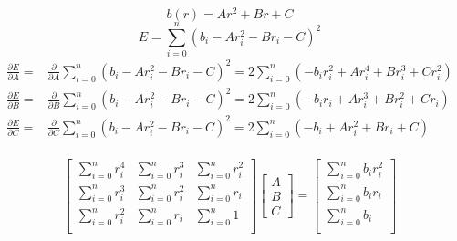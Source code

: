 \begin{equation}
    b(r)=Ar^2+Br+C
\end{equation}
\begin{equation*}
    E=\sum_{i=0}^n\left(b_i-Ar_i^2-Br_i-C\right)^2
\end{equation*}
\begin{equation*}
    \begin{split}
        \frac{\partial E}{\partial A}=&
        \frac{\partial}{\partial A}\sum_{i=0}^{n}\left(b_i-Ar_i^2-Br_i-C\right)^2
        =2\sum_{i=0}^{n}\left(-b_ir_i^2+Ar_i^4+Br_i^3+Cr_i^2\right)\\
        \frac{\partial E}{\partial B}=&
        \frac{\partial}{\partial B}\sum_{i=0}^{n}\left(b_i-Ar_i^2-Br_i-C\right)^2
        =2\sum_{i=0}^{n}\left(-b_ir_i+Ar_i^3+Br_i^2+Cr_i\right)\\
        \frac{\partial E}{\partial C}=&
        \frac{\partial}{\partial C}\sum_{i=0}^{n}\left(b_i-Ar_i^2-Br_i-C\right)^2
        =2\sum_{i=0}^{n}\left(-b_i+Ar_i^2+Br_i+C\right)\\
    \end{split}
\end{equation*}

\begin{equation*}
    \begin{bmatrix}
        \sum_{i=0}^{n}r_i^4 & \sum_{i=0}^{n}r_i^3 & \sum_{i=0}^{n}r_i^2\\
        \sum_{i=0}^{n}r_i^3 & \sum_{i=0}^{n}r_i^2 & \sum_{i=0}^{n}r_i\\
        \sum_{i=0}^{n}r_i^2 & \sum_{i=0}^{n}r_i & \sum_{i=0}^{n}1\\
    \end{bmatrix}
    \begin{bmatrix}
        A \\
        B \\
        C
    \end{bmatrix}
    =
    \begin{bmatrix}
        \sum_{i=0}^{n}b_ir_i^2 \\
        \sum_{i=0}^{n}b_ir_i \\
        \sum_{i=0}^{n}b_i \\
    \end{bmatrix}
\end{equation*}

